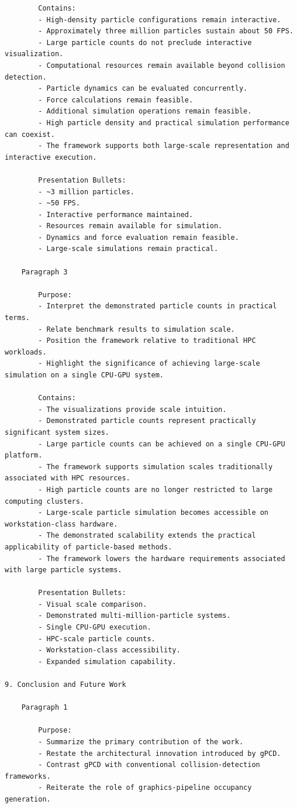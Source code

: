 \begin{verbatim}
		Contains:
		- High-density particle configurations remain interactive.
		- Approximately three million particles sustain about 50 FPS.
		- Large particle counts do not preclude interactive visualization.
		- Computational resources remain available beyond collision detection.
		- Particle dynamics can be evaluated concurrently.
		- Force calculations remain feasible.
		- Additional simulation operations remain feasible.
		- High particle density and practical simulation performance can coexist.
		- The framework supports both large-scale representation and interactive execution.

		Presentation Bullets:
		- ~3 million particles.
		- ~50 FPS.
		- Interactive performance maintained.
		- Resources remain available for simulation.
		- Dynamics and force evaluation remain feasible.
		- Large-scale simulations remain practical.

	Paragraph 3

		Purpose:
		- Interpret the demonstrated particle counts in practical terms.
		- Relate benchmark results to simulation scale.
		- Position the framework relative to traditional HPC workloads.
		- Highlight the significance of achieving large-scale simulation on a single CPU-GPU system.

		Contains:
		- The visualizations provide scale intuition.
		- Demonstrated particle counts represent practically significant system sizes.
		- Large particle counts can be achieved on a single CPU-GPU platform.
		- The framework supports simulation scales traditionally associated with HPC resources.
		- High particle counts are no longer restricted to large computing clusters.
		- Large-scale particle simulation becomes accessible on workstation-class hardware.
		- The demonstrated scalability extends the practical applicability of particle-based methods.
		- The framework lowers the hardware requirements associated with large particle systems.

		Presentation Bullets:
		- Visual scale comparison.
		- Demonstrated multi-million-particle systems.
		- Single CPU-GPU execution.
		- HPC-scale particle counts.
		- Workstation-class accessibility.
		- Expanded simulation capability.

9. Conclusion and Future Work

	Paragraph 1

		Purpose:
		- Summarize the primary contribution of the work.
		- Restate the architectural innovation introduced by gPCD.
		- Contrast gPCD with conventional collision-detection frameworks.
		- Reiterate the role of graphics-pipeline occupancy generation.


\end{verbatim}
